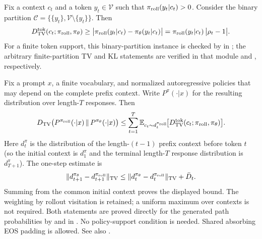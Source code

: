\begin{remark}
\label{rem:binary-tv-lower}
Fix a context $c_t$ and a token $y_t \in \mathcal{V}$ such that $\pi_{\mathrm{roll}}(y_t|c_t)>0$. Consider the binary partition
$\mathcal{C}=\{\{y_t\},\mathcal{V}\setminus\{y_t\}\}$. Then
\begin{equation*}
    D_{\mathrm{TV}}^{\mathrm{tok}}(c_t;\pi_{\mathrm{roll}},\pi_{\theta})
    \ge \big|\pi_{\mathrm{roll}}(y_t|c_t) - \pi_{\theta}(y_t|c_t)\big|
    = \pi_{\mathrm{roll}}(y_t|c_t)\,\big|\rho_t-1\big|.
\end{equation*}
For a finite token support, this binary-partition instance is checked by
 in
; the arbitrary finite-partition TV and KL statements
are verified in that module and , respectively.
\end{remark}

\begin{remark}
\label{rem:seq-tv-sum}
Fix a prompt $x$, a finite vocabulary, and normalized autoregressive policies
that may depend on the complete prefix context. Write $P^{\pi}(\cdot|x)$ for
the resulting distribution over length-$T$ responses. Then
\begin{equation*}
    D_{\mathrm{TV}}\big(P^{\pi_{\mathrm{roll}}}(\cdot|x)\,\|\,P^{\pi_{\theta}}(\cdot|x)\big)
    \le \sum_{t=1}^{T} \mathbb{E}_{c_t \sim d_t^{\pi_{\mathrm{roll}}}}\!\big[D_{\mathrm{TV}}^{\mathrm{tok}}(c_t;\pi_{\mathrm{roll}},\pi_{\theta})\big].
\end{equation*}
Here $d_t^{\pi}$ is the distribution of the length-$(t-1)$ prefix context
before token $t$ (so the initial context is $d_1^{\pi}$ and the terminal
length-$T$ response distribution is $d_{T+1}^{\pi}$). The one-step estimate is
\begin{equation*}
    \|d_{t+1}^{\pi_{\theta}}-d_{t+1}^{\pi_{\mathrm{roll}}}\|_{\mathrm{TV}}
    \le \|d_t^{\pi_{\theta}}-d_t^{\pi_{\mathrm{roll}}}\|_{\mathrm{TV}} + \bar{D}_t.
\end{equation*}
Summing from the common initial context proves the displayed bound. The
weighting by rollout visitation is retained; a uniform maximum over contexts
is not required. Both statements are proved directly for the generated path
probabilities by  and
 in .
No policy-support condition is needed. Shared absorbing EOS padding is
allowed. See also \citet{qi2026rethinkingtrustregionllm}.
\end{remark}

